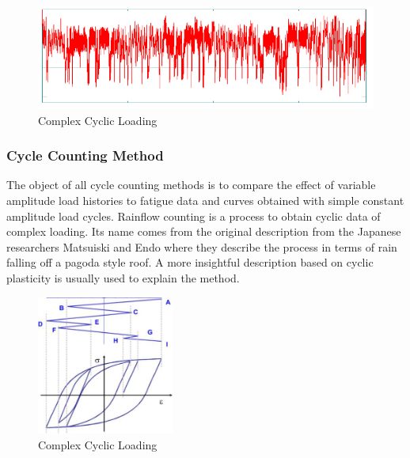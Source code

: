 \documentclass[3p,times,procedia,number]{elsarticle}
\begin{document}
\begin{figure}[h!]
	\centering
	\includegraphics[width=\textwidth]{figures//complexloading.png} 
	\caption{Complex Cyclic Loading}
	\label{complexloading}
\end{figure}


\subsubsection{Cycle Counting Method}

The object of all cycle counting methods is to compare the effect of variable amplitude load histories to fatigue data and curves obtained with simple constant amplitude load cycles. Rainflow counting is a process to obtain cyclic data of complex loading. Its name comes from the original description from the Japanese researchers Matsuiski and Endo where they describe the process in terms of rain falling off a pagoda style roof. A more insightful description based on cyclic plasticity is usually used to explain the method.

\begin{figure}[h!]
	\centering
	\includegraphics[width=0.4\textwidth]{figures//rainflow.jpg} 
	\caption{Complex Cyclic Loading}
	\label{rainflow}
\end{figure}
\end{document}
